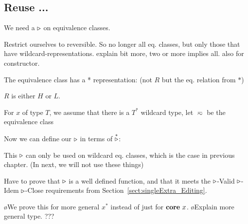 \subsection{Reuse ...}


We need a $\triangleright$ on equivalence classes.


Restrict ourselves to reversible. So no longer all eq. classes, but only those that have wildcard-representations. explain bit more, two or more implies all. also for constructor.


The equivalence class has a * representation: (not $R$ but the eq. relation from $*$)


$R$ is either $H$ or $L$.

For $x$ of type $T$, we assume that there is a $T^*$ wildcard type, let $\eqsim$ be the equivalence class 


Now we can define our $\triangleright$ in terms of $\stackrel{*}{\triangleright}$:


This $\triangleright$ can only be used on wildcard eq. classes, which is the case in previous chapter. (In next, we will not use these things)

Have to prove that $\triangleright$ is a well defined function, and that it meets the  {\sc $\triangleright$-Valid} {\sc $\triangleright$-Idem} 
{\sc $\triangleright$-Close} requirements from Section~\ref{sect:singleExtra_Editing}. 




\bl
\o We prove this for more general $x^*$ instead of just for $\mathbf{core}~x$. 
\o Explain more general type. 
???
\el

